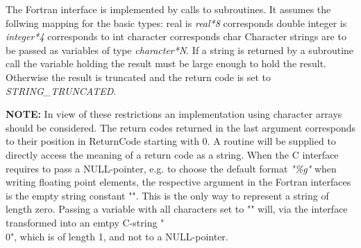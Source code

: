 The Fortran interface is implemented by calls to subroutines.
It assumes the follwing mapping for the basic types:
real is \textsl{real*8} corresponds double
integer is \textsl{integer*4} corresponds to int
character corresponds char
Character strings are to be passed as variables of type \textsl{character*N}. If a string is returned by a subroutine call the variable holding the result must be large enough to hold the result. Otherwise the result is truncated and the return code is set to \textsl{STRING\_TRUNCATED}.

\textbf{NOTE:} In view of these restrictions an implementation using character arrays should be considered.
The return codes returned in the last argument corresponds to their position in ReturnCode starting with 0. A routine will be supplied to directly access the meaning of a return code as a string.
When the C interface requires to pass a NULL-pointer, e.g. to choose the default format \textsl{"\%g"} when writing floating point elements, the respective argument in the Fortran interfaces is the empty string constant "". This is the only way to represent a string of length zero. Passing a variable with all characters set to "" will, via the interface transformed into an emtpy C-string "\\0", which is of length 1, and not to a NULL-pointer. 
